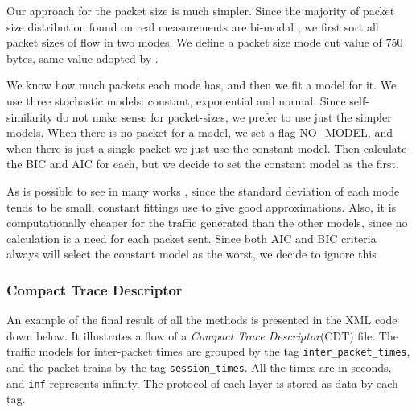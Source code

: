 Our approach for the packet size is much simpler. Since the majority of packet size distribution found on real measurements are bi-modal \cite{packet-distribution-model}\cite{sourcesonoff-paper}\cite{udp-flows-model}, we first sort all packet sizes of flow in two modes. We define a packet size mode cut value of 750 bytes, same value adopted by \cite{udp-flows-model}. 

We know how much packets each mode has, and then we fit a model for it. We use three stochastic models: constant, exponential and normal. Since self-similarity do not make sense for packet-sizes, we prefer to use just the simpler models. When there is no packet for a model, we set a flag NO\_MODEL, and when there is just a single packet we just use the constant model. Then calculate the BIC and AIC for each, but we decide to set the constant model as the first.

As is possible to see in many works \cite{packet-distribution-model} \cite{udp-flows-model}, since the standard deviation of each mode tends to be small, constant fittings use to give good approximations. Also, it is computationally cheaper for the traffic generated than the other models, since no calculation is a need for each packet sent. Since both AIC and BIC criteria always will select the constant model as the worst, we decide to ignore this

\subsubsection{Compact Trace Descriptor}

An example of the final result of all the methods is presented in the XML code down below. It illustrates a flow of a \textit{Compact Trace Descriptor}(CDT) file. The traffic models for inter-packet times are grouped by the tag \texttt{inter\_packet\_times}, and the packet trains by the tag \texttt{session\_times}. All the times are in seconds, and \texttt{inf} represents infinity. The protocol of each layer is stored as data by each tag.

